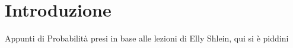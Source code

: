 \chapter{Introduzione}

Appunti di Probabilità presi in base alle lezioni di Elly Shlein, qui si è piddini